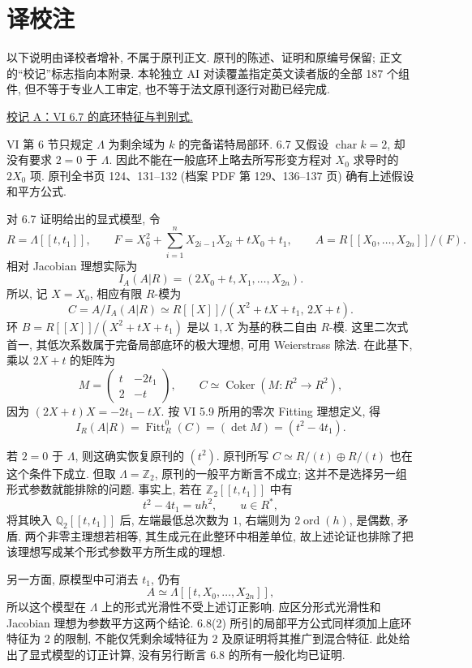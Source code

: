 \clearpage
\renewcommand{\CurrentExpose}{译校注}
{}
\section*{译校注}

以下说明由译校者增补, 不属于原刊正文. 原刊的陈述、证明和原编号保留;
正文的“校记”标志指向本附录. 本轮独立 AI 对读覆盖指定英文读者版的全部
187 个组件, 但不等于专业人工审定, 也不等于法文原刊逐行对勘已经完成.

\medskip
\noindent\hypertarget{editorial-vi-mixedchar}{}\underline{校记 A：VI 6.7 的底环特征与判别式.}

VI 第 6 节只规定 $\Lambda$ 为剩余域为 $k$ 的完备诺特局部环.
6.7 又假设 $\operatorname{char}k=2$, 却没有要求 $2=0$ 于 $\Lambda$.
因此不能在一般底环上略去所写形变方程对 $X_0$ 求导时的 $2X_0$ 项.
原刊全书页 124、131--132 (档案 PDF 第 129、136--137 页) 确有上述假设和平方公式.

对 6.7 证明给出的显式模型, 令
\[
 R=\Lambda[[t,t_1]],\qquad
 F=X_0^2+\sum_{i=1}^{n}X_{2i-1}X_{2i}+tX_0+t_1,
 \qquad A=R[[X_0,\ldots,X_{2n}]]/(F).
\]
相对 Jacobian 理想实际为
\[
 I_A(A|R)=(2X_0+t,X_1,\ldots,X_{2n}).
\]
所以, 记 $X=X_0$, 相应有限 $R$-模为
\[
 C=A/I_A(A|R)
   \simeq R[[X]]/(X^2+tX+t_1,\,2X+t).
\]
环 $B=R[[X]]/(X^2+tX+t_1)$ 是以 $1,X$ 为基的秩二自由 $R$-模.
这里二次式首一, 其低次系数属于完备局部底环的极大理想, 可用 Weierstrass 除法.
在此基下, 乘以 $2X+t$ 的矩阵为
\[
 M=\begin{pmatrix}t&-2t_1\\2&-t\end{pmatrix},
 \qquad C\simeq\operatorname{Coker}(M:R^2\longrightarrow R^2),
\]
因为 $(2X+t)X=-2t_1-tX$. 按 VI 5.9 所用的零次 Fitting 理想定义, 得
\[
 I_R(A|R)=\operatorname{Fitt}^0_R(C)
         =(\det M)=(t^2-4t_1).
\]

若 $2=0$ 于 $\Lambda$, 则这确实恢复原刊的 $(t^2)$.
原刊所写 $C\simeq R/(t)\oplus R/(t)$ 也在这个条件下成立.
但取 $\Lambda=\mathbb Z_2$, 原刊的一般平方断言不成立;
这并不是选择另一组形式参数就能排除的问题.
事实上, 若在 $\mathbb Z_2[[t,t_1]]$ 中有
\[
 t^2-4t_1=u h^2,\qquad u\in R^*,
\]
将其映入 $\mathbb Q_2[[t,t_1]]$ 后, 左端最低总次数为 $1$,
右端则为 $2\operatorname{ord}(h)$, 是偶数, 矛盾.
两个非零主理想若相等, 其生成元在此整环中相差单位,
故上述论证也排除了把该理想写成某个形式参数平方所生成的理想.

另一方面, 原模型中可消去 $t_1$, 仍有
\[
 A\simeq\Lambda[[t,X_0,\ldots,X_{2n}]],
\]
所以这个模型在 $\Lambda$ 上的形式光滑性不受上述订正影响.
应区分形式光滑性和 Jacobian 理想为参数平方这两个结论.
6.8(2) 所引的局部平方公式同样须加上底环特征为 $2$ 的限制,
不能仅凭剩余域特征为 $2$ 及原证明将其推广到混合特征.
此处给出了显式模型的订正计算, 没有另行断言 6.8 的所有一般化均已证明.

